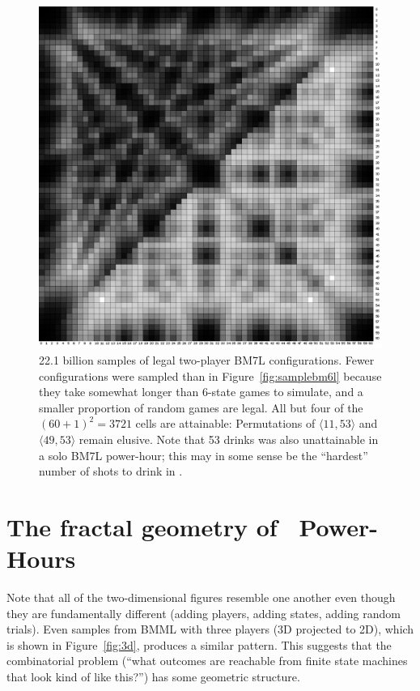\documentclass[twocolumn]{article}
\begin{document}
\begin{figure}[ht!]
\begin{center}
\includegraphics[width=0.90 \linewidth]{sample60min2players7states.png}
\end{center}\vspace{-0.1in}
\caption{ 22.1 billion samples of legal two-player BM7L
  configurations. Fewer configurations were sampled than in
  Figure~\ref{fig:samplebm6l} because they take somewhat longer than
  6-state games to simulate, and a smaller proportion of random games
  are legal.
  All but four of the $(60 + 1)^2 = 3721$ cells are attainable: 
  Permutations of $\langle 11, 53 \rangle$ and $\langle 49, 53 \rangle$
  remain elusive. Note that 53 drinks was also unattainable in a solo
  BM7L power-hour; this may in some sense be the ``hardest'' number of
  shots to drink in \bmsl.
}
\label{fig:samplebm7l}
\end{figure}


\section{The fractal geometry of \kn\ Power-Hours}

Note that all of the two-dimensional figures resemble one another even
though they are fundamentally different (adding players, adding
states, adding random trials). Even samples from BMML with three
players (3D projected to 2D), which is shown in Figure~\ref{fig:3d},
produces a similar pattern. This suggests that the combinatorial
problem (``what outcomes are reachable from finite state machines that
look kind of like this?'') has some geometric structure.
\end{document}
